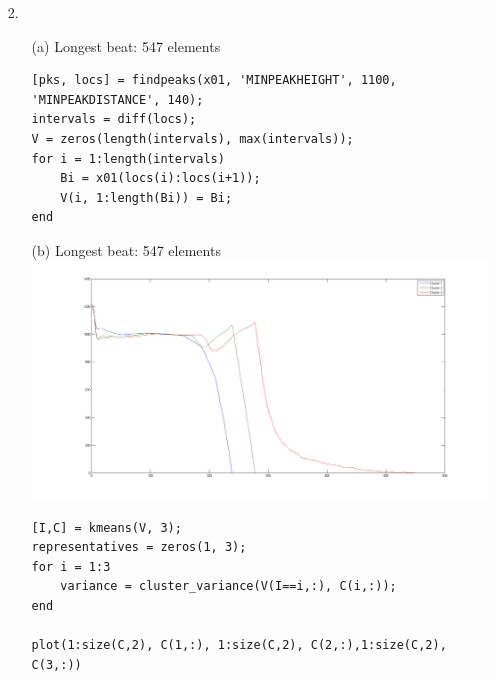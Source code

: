 \documentclass{article}
\begin{document}
\begin{enumerate}
\newpage

\item[2.]
	\begin{enumerate}
	\item[(a)]
		Longest beat: 547 elements
\begin{lstlisting}   
[pks, locs] = findpeaks(x01, 'MINPEAKHEIGHT', 1100, 'MINPEAKDISTANCE', 140);
intervals = diff(locs);
V = zeros(length(intervals), max(intervals));
for i = 1:length(intervals)
    Bi = x01(locs(i):locs(i+1));
    V(i, 1:length(Bi)) = Bi;
end
\end{lstlisting}

\bigskip

	\item[(b)]
		Longest beat: 547 elements\\
	\includegraphics[scale=0.25]{../images/K3Clusters} \\
\begin{lstlisting}   
[I,C] = kmeans(V, 3);   
representatives = zeros(1, 3);
for i = 1:3
    variance = cluster_variance(V(I==i,:), C(i,:));
end

plot(1:size(C,2), C(1,:), 1:size(C,2), C(2,:),1:size(C,2), C(3,:))
\end{lstlisting}

\newpage


\end{enumerate}
\end{enumerate}
\end{document}
